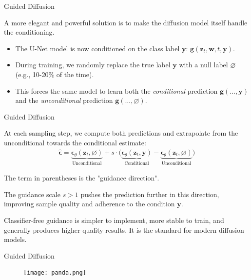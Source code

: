 \documentclass[aspectratio=169,xcolor=dvipsnames]{beamer}
\theoremstyle{named}
\begin{document}
\begin{frame}{Guided Diffusion}

A more elegant and powerful solution is to make the diffusion model itself handle the conditioning.
\begin{itemize}
    \item The U-Net model is now conditioned on the class label $\mathbf{y}$: $\mathbf{g}(\mathbf{z}_t, \mathbf{w}, t, \mathbf{y})$.
    \item During training, we randomly replace the true label $\mathbf{y}$ with a null label $\varnothing$ (e.g., 10-20\% of the time).
    \item This forces the \alert{same model} to learn both the \textit{conditional} prediction $\mathbf{g}(\dots, \mathbf{y})$ and the \textit{unconditional} prediction $\mathbf{g}(\dots, \varnothing)$.
\end{itemize}

\end{frame}


\begin{frame}{Guided Diffusion}

At each sampling step, we \alert{compute both predictions and extrapolate} from the unconditional towards the conditional estimate:
\begin{align*}
    \hat{\boldsymbol{\epsilon}} = \underbrace{\boldsymbol{\epsilon}_\theta(\mathbf{z}_t, \varnothing)}_\text{Unconditional} + s \cdot \Big( \underbrace{\boldsymbol{\epsilon}_\theta(\mathbf{z}_t, \mathbf{y})}_\text{Conditional} - \underbrace{\boldsymbol{\epsilon}_\theta(\mathbf{z}_t, \varnothing)}_\text{Unconditional} \Big)
\end{align*}

The term in parentheses is the "guidance direction".

\vspace{1em}

The guidance scale $s > 1$ pushes the prediction further in this direction, improving sample quality and adherence to the condition $\mathbf{y}$.

\vspace{1em}

Classifier-free guidance is simpler to implement, more stable to train, and generally produces higher-quality results. It is the standard for modern diffusion models.
\end{frame}


\begin{frame}{Guided Diffusion}

\begin{figure}[h!]
\centering
\texttt{[image: panda.png]}
\end{figure}

\end{frame}


\end{document}
